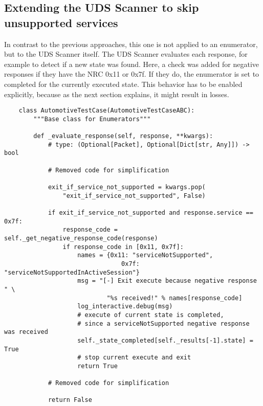 \subsection{Extending the UDS Scanner to skip unsupported services}

In contrast to the previous approaches, this one is not applied to an enumerator, but to the UDS Scanner itself. The UDS Scanner evaluates each response, for example to detect if a new state was found. Here, a check was added for negative responses if they have the NRC 0x11 or 0x7f. If they do, the enumerator is set to completed for the currently executed state. This behavior has to be enabled explicitly, because as the next section explains, it might result in losses.

\begin{verbatim}
    class AutomotiveTestCase(AutomotiveTestCaseABC):
        """Base class for Enumerators"""
    
        def _evaluate_response(self, response, **kwargs):
            # type: (Optional[Packet], Optional[Dict[str, Any]]) -> bool
    
            # Removed code for simplification
    
            exit_if_service_not_supported = kwargs.pop(
                "exit_if_service_not_supported", False)
    
            if exit_if_service_not_supported and response.service == 0x7f:
                response_code = self._get_negative_response_code(response)
                if response_code in [0x11, 0x7f]:
                    names = {0x11: "serviceNotSupported",
                                0x7f: "serviceNotSupportedInActiveSession"}
                    msg = "[-] Exit execute because negative response " \
                            "%s received!" % names[response_code]
                    log_interactive.debug(msg)
                    # execute of current state is completed,
                    # since a serviceNotSupported negative response was received
                    self._state_completed[self._results[-1].state] = True
                    # stop current execute and exit
                    return True
    
            # Removed code for simplification
    
            return False
\end{verbatim}
    
